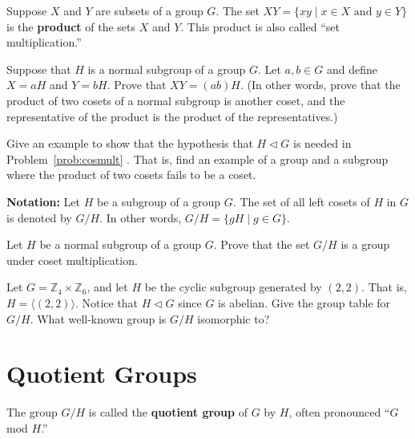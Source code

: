 \begin{definition}
Suppose \(X\) and \(Y\) are subsets of a group \(G\). The set \(XY = \{xy \mid x\in X \mbox{ and } y\in Y\}\) is the \textbf{product} of the sets \(X\) and \(Y\). This product is also called ``set multiplication.''
\end{definition}

\begin{problem}\label{prob:cosmult}
Suppose that \(H\) is a normal subgroup of a group \(G\). Let \(a,b\in G\) and define \(X = aH\) and \(Y = bH\). Prove that \(XY = (ab)H\). (In other words, prove that the product of two cosets of a normal subgroup is another coset, and the representative of the product is the product of the representatives.)
\end{problem}

\begin{problem}
Give an example to show that the hypothesis that \(H\lhd G\)  is needed in Problem~\ref{prob:cosmult} . That is, find an example of a group and a subgroup where the product of two cosets fails to be a coset.
\end{problem}

\textbf{Notation:} Let \(H\) be a subgroup of a group \(G\). The set of all left cosets of \(H\) in \(G\) is denoted by \(G/H\). In other words, \(G/H = \{gH \mid g\in G\}\).

\begin{problem}
Let \(H\) be a normal subgroup of a group \(G\). Prove that the set \(G/H\)  is a group under coset multiplication.
\end{problem}

\begin{problem}
Let \(G = \mathbb{Z}_4\times \mathbb{Z}_6\), and let \(H\) be the cyclic subgroup generated by \((2,2)\). That is, \(H = \langle (2,2) \rangle \). Notice that \(H \lhd G\)  since \(G\) is abelian. Give the group table for \(G/H\). What well-known group is \(G/H\) isomorphic to?
\end{problem}

\section{Quotient Groups}

\begin{definition}
The group \(G/H\) is called the \textbf{quotient group} of \(G\) by \(H\), often pronounced ``\(G\) mod \(H\).''
\end{definition}


